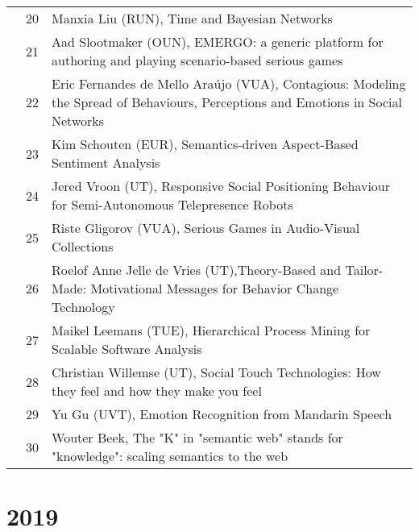 {\begin{xltabular}{\linewidth}{@{} l @{\hspace{0.5em}} l @{\hspace{1em}} X @{}}
        &	 20	&	 Manxia Liu (RUN), Time and Bayesian Networks \\
        &	 21	&	 Aad Slootmaker (OUN), EMERGO: a generic platform for authoring and playing scenario-based serious games \\
        &	 22	&	 Eric Fernandes de Mello Ara\'{u}jo (VUA), Contagious: Modeling the Spread of Behaviours, Perceptions and Emotions in Social Networks \\
        &	 23	&	 Kim Schouten (EUR), Semantics-driven Aspect-Based Sentiment Analysis \\
        &	 24	&	 Jered Vroon (UT), Responsive Social Positioning Behaviour for Semi-Autonomous Telepresence Robots \\
        &	 25	&	 Riste Gligorov (VUA), Serious Games in Audio-Visual Collections \\
        &	 26	& 	 Roelof Anne Jelle de Vries (UT),Theory-Based and Tailor-Made: Motivational Messages for Behavior Change Technology \\
        &	 27	&	 Maikel Leemans (TUE), Hierarchical Process Mining for Scalable Software Analysis \\
        &	 28	&	 Christian Willemse (UT), Social Touch Technologies: How they feel and how they make you feel \\
        &	 29	&	 Yu Gu (UVT), Emotion Recognition from Mandarin Speech \\
        &	 30	&	 Wouter Beek,  The "K" in "semantic web" stands for "knowledge": scaling semantics to the web \\


\end{xltabular}


\section*{2019}
\begin{xltabular}{\linewidth}{@{} l @{\hspace{0.5em}} l @{\hspace{1em}} X @{}}


\end{xltabular}}
